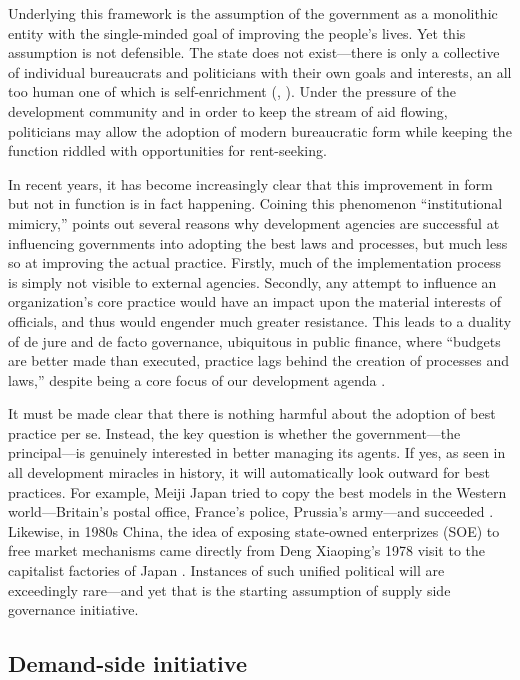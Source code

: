 \documentclass[12pt]{article}
\begin{document}
Underlying this framework is the assumption of the government as a monolithic entity with the single-minded goal of improving the people's lives. Yet this assumption is not defensible. The state does not exist---there is only a collective of individual bureaucrats and politicians with their own goals and interests, an all too human one of which is self-enrichment (\citealp{Booth2012}, \citealp{Shleifer2002}). Under the pressure of the development community and in order to keep the stream of aid flowing, politicians may allow the adoption of modern bureaucratic form while keeping the function riddled with opportunities for rent-seeking.

In recent years, it has become increasingly clear that this improvement in form but not in function is in fact happening.  Coining this phenomenon ``institutional mimicry,'' \citet{Andrews2009} points out several reasons why development agencies are successful at influencing governments into adopting the best laws and processes, but much less so at improving the actual practice. Firstly, much of the implementation process is simply not visible to external agencies. Secondly, any attempt to influence an organization's core practice would have an impact upon the material interests of officials, and thus would engender much greater resistance. This leads to a duality of de jure and de facto governance, ubiquitous in public finance, where ``budgets are better made than executed, practice lags behind the creation of processes and laws,'' despite being a core focus of our development agenda \citep{Andrews2010}.

It must be made clear that there is nothing harmful about the adoption of best practice per se. Instead, the key question is whether the government---the principal---is genuinely interested in better managing its agents. If yes, as seen in all development miracles in history, it will automatically look outward for best practices. For example, Meiji Japan tried to copy the best models in the Western world---Britain's postal office, France's police, Prussia's army---and succeeded \citep{Krause2013}. Likewise, in 1980s China, the idea of exposing state-owned enterprizes (SOE) to free market mechanisms came directly from Deng Xiaoping's 1978 visit to the capitalist factories of Japan \citep{Coase2012}. Instances of such unified political will are exceedingly rare---and yet that is the starting assumption of supply side governance initiative.

\subsection{Demand-side initiative} \label{sec:demandside}
\end{document}
